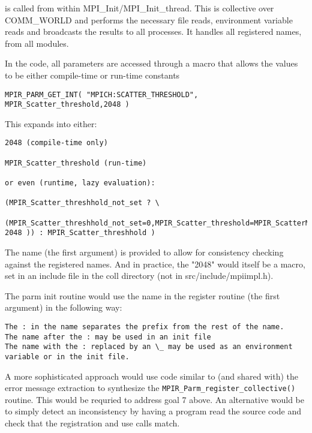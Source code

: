 \documentclass{report}
\begin{document}
is called from within MPI\_Init/MPI\_Init\_thread.  This is collective
over COMM\_WORLD and performs the 
necessary file reads, environment variable reads and broadcasts the
results to all processes.  It handles all registered names, from all
modules.

In the code, all parameters are accessed through a macro that allows
the values to be either compile-time or run-time constants

\begin{verbatim}
MPIR_PARM_GET_INT( "MPICH:SCATTER_THRESHOLD", MPIR_Scatter_threshold,2048 )
\end{verbatim}

This expands into either:
\begin{verbatim}
2048 (compile-time only)

MPIR_Scatter_threshold (run-time)

or even (runtime, lazy evaluation):

(MPIR_Scatter_threshhold_not_set ? \
    (MPIR_Scatter_threshhold_not_set=0,MPIR_Scatter_threshold=MPIR_ScatterMPIRParmGetInt("MPICH:SCATTER_THRESHOLD", 2048 )) : MPIR_Scatter_threshhold )
\end{verbatim}

The name (the first argument) is provided to allow for consistency
checking against the registered names.   And in practice, the "2048"
would itself be a macro, set in an include file in the coll directory
(not in src/include/mpiimpl.h).  

The parm init routine would use the name in the register routine (the
first argument) in the following way:

\begin{verbatim}
The : in the name separates the prefix from the rest of the name.
The name after the : may be used in an init file
The name with the : replaced by an \_ may be used as an environment
variable or in the init file.
\end{verbatim}

A more sophisticated approach would use code similar to (and shared
with) the error message extraction to synthesize the
\texttt{MPIR\_Parm\_register\_collective()} routine.  This would be requried to
address goal 7 above.  An alternative would be to simply detect an
inconsistency by having a program read the source code and check that
the registration and use calls match.
\end{document}
